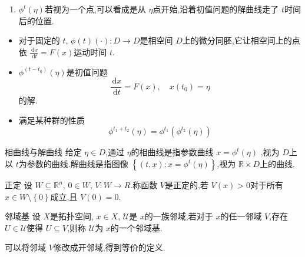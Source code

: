 \documentclass[lang=cn,12pt,color=green,fontset=none]{elegantbook}
\begin{document}
\begin{note}
    \begin{enumerate}
        \item $ \phi ^{t}\left( \eta  \right)  $若视为一个点,可以看成是从 $ \eta  $点开始,沿着初值问题的解曲线走了 $ t $时间后的位置. 
    \end{enumerate}
    
    
\end{note}
\begin{remark}
    \begin{itemize}
        \item 对于固定的 $ t $, $ \phi \left( t \right)\left( \cdot  \right) :D\to D  $是相空间 $ D $上的微分同胚,它让相空间上的点依 $ \frac{\,\mathrm{d} x }{ \,\mathrm{d} t}=F\left( x \right)   $运动时间 $ t $.  
        \item  $ \phi ^{\left( t-t_0 \right) }\left( \eta  \right)  $是初值问题 $$
        \frac{\,\mathrm{d} x }{\,\mathrm{d} t } = F\left( x \right),\quad  x\left( t_0 \right) =\eta    
        $$ 的解.
        \item 满足某种群的性质$$
        \phi ^{t_1+ t_2}\left( \eta  \right)=\phi ^{t_1}\left( \phi ^{t_2}\left( \eta  \right)  \right)  
        $$
    \end{itemize}
    
    
\end{remark}

\begin{definition}{相曲线与解曲线}
    给定 $ \eta  \in D $,通过 $ \eta  $的相曲线是指参数曲线 $ x = \phi ^{t}\left( \eta  \right)  $ ,视为 $ D $上以 $ t $为参数的曲线.解曲线是指图像 $ \left\{ \left( t,x \right): x = \phi ^{t}\left( \eta  \right)   \right\} $,视为 $ \mathbb{R} \times D $上的曲线.  
\end{definition}  



\begin{definition}{正定}
    设 $ W\subseteq \mathbb{R} ^{n} $, $ 0 \in W $, $ V:W\to R $.称函数 $ V $是正定的,若 $ V\left( x \right)>0  $对于所有 $ x \in W\setminus \left\{ 0 \right\} $成立,且 $ V\left( 0 \right)  =0$.      
\end{definition}

\begin{definition}{邻域基}
    设 $ X $是拓扑空间, $ x \in X $, $ \mathcal{U} $是 $ x $的一族邻域,若对于 $ x $的任一邻域 $ V $,存在 $ U \in \mathcal{U} $使得 $ U\subseteq V $,则称 $ \mathcal{U} $为 $ x $的一个邻域基.       
\end{definition}  
\begin{remark}
    可以将邻域 $ V $修改成开邻域,得到等价的定义. 
\end{remark}
\end{document}
